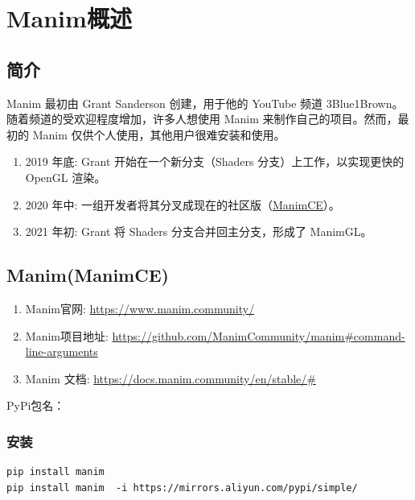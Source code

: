 \chapter{Manim概述}
\section{简介}
Manim 最初由 Grant Sanderson 创建，用于他的 YouTube 频道 3Blue1Brown。随着频道的受欢迎程度增加，许多人想使用 Manim 来制作自己的项目。然而，最初的 Manim 仅供个人使用，其他用户很难安装和使用。

\begin{enumerate}[label=\arabic*)]
    \item 2019 年底: Grant 开始在一个新分支（Shaders 分支）上工作，以实现更快的 OpenGL 渲染。
    \item 2020 年中: 一组开发者将其分叉成现在的社区版（\href{https://github.com/ManimCommunity/manim/}{ManimCE}）。
    \item 2021 年初: Grant 将 Shaders 分支合并回主分支，形成了 ManimGL。
\end{enumerate}


        
\section{Manim(ManimCE)}
\begin{enumerate}[label=\arabic*)]
    \item Manim官网: \url{https://www.manim.community/}
    \item Manim项目地址: \url{https://github.com/ManimCommunity/manim#command-line-arguments}
    \item Manim 文档: \url{https://docs.manim.community/en/stable/#}
\end{enumerate}

PyPi包名：

\subsection{安装}
\begin{lstlisting}[style=demostyle,numbers=none]
pip install manim
pip install manim  -i https://mirrors.aliyun.com/pypi/simple/
\end{lstlisting}

